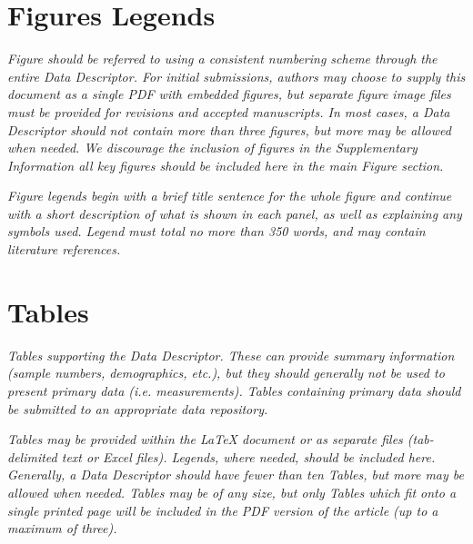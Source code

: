 \documentclass[english]{article}
\begin{document}
\section*{Figures Legends}
\emph{Figure should be referred to using a consistent numbering scheme through
the entire Data Descriptor. For initial submissions, authors may choose
to supply this document as a single PDF with embedded figures, but
separate figure image files must be provided for revisions and accepted
manuscripts. In most cases, a Data Descriptor should not contain more
than three figures, but more may be allowed when needed. We discourage
the inclusion of figures in the Supplementary Information \textendash{}
all key figures should be included here in the main Figure section.}

\emph{Figure legends begin with a brief title sentence for the whole figure
and continue with a short description of what is shown in each panel,
as well as explaining any symbols used. Legend must total no more
than 350 words, and may contain literature references.}

\section*{Tables}

\emph{Tables supporting the Data Descriptor. These can provide summary information
(sample numbers, demographics, etc.), but they should generally not
be used to present primary data (i.e. measurements). Tables containing
primary data should be submitted to an appropriate data repository.}

\emph{Tables may be provided within the \LaTeX{} document or as separate
files (tab-delimited text or Excel files). Legends, where needed,
should be included here. Generally, a Data Descriptor should have
fewer than ten Tables, but more may be allowed when needed. Tables
may be of any size, but only Tables which fit onto a single printed
page will be included in the PDF version of the article (up to a maximum
of three).}

{\small
}

%
%
\end{document}
